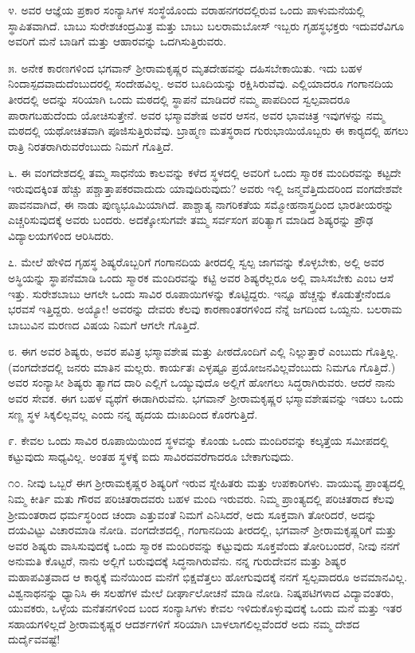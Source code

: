  ೪. ಅವರ ಆಜ್ಞೆಯ ಪ್ರಕಾರ ಸಂನ್ಯಾಸಿಗಳ ಸಂಸ್ಥೆಯೊಂದು ವರಾಹನಗರದಲ್ಲಿರುವ ಒಂದು ಪಾಳುಮನೆಯಲ್ಲಿ ಸ್ಥಾಪಿತವಾಗಿದೆ. ಬಾಬು ಸುರೇಶಚಂದ್ರಮಿತ್ರ ಮತ್ತು ಬಾಬು ಬಲರಾಮಬೋಸ್ ಇಬ್ಬರು ಗೃಹಸ್ಥಭಕ್ತರು ಇದುವರೆವಿಗೂ ಅವರಿಗೆ ಮನೆ ಬಾಡಿಗೆ ಮತ್ತು ಆಹಾರವನ್ನು ಒದಗಿಸುತ್ತಿರುವರು. 

 ೫. ಅನೇಕ ಕಾರಣಗಳಿಂದ ಭಗವಾನ್ ಶ‍್ರೀರಾಮಕೃಷ್ಣರ ಮೃತದೇಹವನ್ನು ದಹಿಸಬೇಕಾಯಿತು. ಇದು ಬಹಳ ನಿಂದಾಸ್ಪದವಾದುದೆಂಬುದರಲ್ಲಿ ಸಂದೇಹವಿಲ್ಲ. ಅವರ ಬೂದಿಯನ್ನು ರಕ್ಷಿಸಿರುವೆವು. ಎಲ್ಲಿಯಾದರೂ ಗಂಗಾನದಿಯ ತೀರದಲ್ಲಿ ಅದನ್ನು ಸರಿಯಾಗಿ ಒಂದು ಮಠದಲ್ಲಿ ಸ್ಥಾಪನೆ ಮಾಡಿದರೆ ನಮ್ಮ ಪಾಪದಿಂದ ಸ್ವಲ್ಪವಾದರೂ ಪಾರಾಗಬಹುದೆಂದು ಯೋಚಿಸುತ್ತೇನೆ. ಅವರ ಭಸ್ಮಾವಶೇಷ ಅವರ ಆಸನ, ಅವರ ಭಾವಚಿತ್ರ ಇವುಗಳನ್ನು ನಮ್ಮ ಮಠದಲ್ಲಿ ಯಥೋಚಿತವಾಗಿ ಪೂಜಿಸುತ್ತಿರುವೆವು. ಬ್ರಾಹ್ಮಣ ಮತಸ್ಥರಾದ ಗುರುಭಾಯಿಯೊಬ್ಬರು ಈ ಕಾರ‍್ಯದಲ್ಲಿ ಹಗಲು ರಾತ್ರಿ ನಿರತರಾಗಿರುವರೆಂಬುದು ನಿಮಗೆ ಗೊತ್ತಿದೆ. 

 ೬. ಈ ವಂಗದೇಶದಲ್ಲಿ ತಮ್ಮ ಸಾಧನೆಯ ಕಾಲವನ್ನು ಕಳೆದ ಸ್ಥಳದಲ್ಲಿ ಅವರಿಗೆ ಒಂದು ಸ್ಮಾರಕ ಮಂದಿರವನ್ನು ಕಟ್ಟದೇ ಇರುವುದಕ್ಕಿಂತ ಹೆಚ್ಚು ಪಶ್ಚಾತ್ತಾಪಕರವಾದುದು ಯಾವುದಿರುವುದು? ಅವರು ಇಲ್ಲಿ ಜನ್ಮವೆತ್ತಿದುದರಿಂದ ವಂಗದೇಶವೇ ಪಾವನವಾಗಿದೆ, ಈ ನಾಡು ಪುಣ್ಯಭೂಮಿಯಾಗಿದೆ. ಪಾಶ್ಚಾತ್ಯ ನಾಗರಿಕತೆಯ ಸಮ್ಮೋಹನಾಸ್ತ್ರದಿಂದ ಭಾರತೀಯರನ್ನು ಎಚ್ಚರಿಸುವುದಕ್ಕೆ ಅವರು ಬಂದರು. ಅದಕ್ಕೋಸುಗವೇ ತಮ್ಮ ಸರ್ವಸಂಗ ಪರಿತ್ಯಾಗ ಮಾಡಿದ ಶಿಷ್ಯರನ್ನು ಪ್ರೌಢ ವಿದ್ಯಾಲಯಗಳಿಂದ ಆರಿಸಿದರು. 

 ೭. ಮೇಲೆ ಹೇಳಿದ ಗೃಹಸ್ಥ ಶಿಷ್ಯರೊಬ್ಬರಿಗೆ ಗಂಗಾನದಿಯ ತೀರದಲ್ಲಿ ಸ್ವಲ್ಪ ಜಾಗವನ್ನು ಕೊಳ್ಳಬೇಕು, ಅಲ್ಲಿ ಅವರ ಅಸ್ಥಿಯನ್ನು ಸ್ಥಾಪನೆಮಾಡಿ ಒಂದು ಸ್ಮಾರಕ ಮಂದಿರವನ್ನು ಕಟ್ಟಿ ಅವರ ಶಿಷ್ಯರೆಲ್ಲರೂ ಅಲ್ಲಿ ವಾಸಿಸಬೇಕು ಎಂಬ ಆಸೆ ಇತ್ತು. ಸುರೇಶಬಾಬು ಆಗಲೇ ಒಂದು ಸಾವಿರ ರೂಪಾಯಿಗಳನ್ನು ಕೊಟ್ಟಿದ್ದರು. ಇನ್ನೂ ಹೆಚ್ಚನ್ನು ಕೊಡುತ್ತೇನೆಂದೂ ಭರವಸೆ ಇತ್ತಿದ್ದರು. ಅಯ್ಯೋ! ಅವರನ್ನು ದೇವರು ಕೆಲವು ಕಾರಣಾಂತರಗಳಿಂದ ನೆನ್ನೆ ಜಗದಿಂದ ಒಯ್ದನು. ಬಲರಾಮ ಬಾಬುವಿನ ಮರಣದ ವಿಷಯ ನಿಮಗೆ ಆಗಲೇ ಗೊತ್ತಿದೆ. 

 ೮. ಈಗ ಅವರ ಶಿಷ್ಯರು, ಅವರ ಪವಿತ್ರ ಭಸ್ಮಾವಶೇಷ ಮತ್ತು ಪೀಠದೊಂದಿಗೆ ಎಲ್ಲಿ ನಿಲ್ಲುತ್ತಾರೆ ಎಂಬುದು ಗೊತ್ತಿಲ್ಲ. (ವಂಗದೇಶದಲ್ಲಿ ಜನರು ಮಾತಿನ ಮಲ್ಲರು. ಕಾರ್ಯತಃ ಎಳ್ಳಷ್ಟೂ ಪ್ರಯೋಜನವಿಲ್ಲವೆಂಬುದು ನಿಮಗೂ ಗೊತ್ತಿದೆ.) ಅವರ ಸಂನ್ಯಾಸೀ ಶಿಷ್ಯರು ತ್ಯಾಗದ ದಾರಿ ಎಲ್ಲಿಗೆ ಒಯ್ಯುವುದೊ ಅಲ್ಲಿಗೆ ಹೋಗಲು ಸಿದ್ಧರಾಗಿರುವರು. ಆದರೆ ನಾನು ಅವರ ಸೇವಕ. ಈಗ ಬಹಳ ವ್ಯಥೆಗೆ ಈಡಾಗಿರುವೆನು. ಭಗವಾನ್ ಶ‍್ರೀರಾಮಕೃಷ್ಣರ ಭಸ್ಮಾವಶೇಷವನ್ನು ಇಡಲು ಒಂದು ಸಣ್ಣ ಸ್ಥಳ ಸಿಕ್ಕಲಿಲ್ಲವಲ್ಲ ಎಂದು ನನ್ನ ಹೃದಯ ದುಃಖದಿಂದ ಕೊರಗುತ್ತಿದೆ. 

 ೯. ಕೇವಲ ಒಂದು ಸಾವಿರ ರೂಪಾಯಿಯಿಂದ ಸ್ಥಳವನ್ನು ಕೊಂಡು ಒಂದು ಮಂದಿರವನ್ನು ಕಲ್ಕತ್ತೆಯ ಸಮೀಪದಲ್ಲಿ ಕಟ್ಟುವುದು ಸಾಧ್ಯವಿಲ್ಲ. ಅಂತಹ ಸ್ಥಳಕ್ಕೆ ಐದು ಸಾವಿರದವರೆಗಾದರೂ ಬೇಕಾಗುವುದು. 

 ೧೦. ನೀವು ಒಬ್ಬರೆ ಈಗ ಶ‍್ರೀರಾಮಕೃಷ್ಣರ ಶಿಷ್ಯರಿಗೆ ಇರುವ ಸ್ನೇಹಿತರು ಮತ್ತು ಉಪಕಾರಿಗಳು. ವಾಯುವ್ಯ ಪ್ರಾಂತ್ಯದಲ್ಲಿ ನಿಮ್ಮ ಕೀರ್ತಿ ಮತು ಗೌರವ ಪರಿಚಿತರಾದವರು ಬಹಳ ಮಂದಿ ಇರುವರು. ನಿಮ್ಮ ಪ್ರಾಂತ್ಯದಲ್ಲಿ ಪರಿಚಿತರಾದ ಕೆಲವು ಶ‍್ರೀಮಂತರಾದ ಧರ್ಮಸ್ಥರಿಂದ ಚಂದಾ ಎತ್ತುವಂತೆ ನಿಮಗೆ ಎನಿಸಿದರೆ, ಅದು ಸೂಕ್ತವಾಗಿ ತೋರಿದರೆ, ಅದನ್ನು ದಯವಿಟ್ಟು ವಿಚಾರಮಾಡಿ ನೋಡಿ. ವಂಗದೇಶದಲ್ಲಿ, ಗಂಗಾನದಿಯ ತೀರದಲ್ಲಿ, ಭಗವಾನ್ ಶ‍್ರೀರಾಮಕೃಷ್ಣರಿಗೆ ಮತ್ತು ಅವರ ಶಿಷ್ಯರು ವಾಸಿಸುವುದಕ್ಕೆ ಒಂದು ಸ್ಮಾರಕ ಮಂದಿರವನ್ನು ಕಟ್ಟುವುದು ಸೂಕ್ತವೆಂದು ತೋರಿಬಂದರೆ, ನೀವು ನನಗೆ ಅನುಮತಿ ಕೊಟ್ಟರೆ, ನಾನು ಅಲ್ಲಿಗೆ ಬರುವುದಕ್ಕೆ ಸಿದ್ಧನಾಗಿರುವೆನು. ನನ್ನ ಗುರುದೇವನ ಮತ್ತು ಶಿಷ್ಯರ ಮಹಾಪವಿತ್ರವಾದ ಆ ಕಾರ‍್ಯಕ್ಕೆ ಮನೆಯಿಂದ ಮನೆಗೆ ಭಿಕ್ಷವೆತ್ತಲು ಹೋಗುವುದಕ್ಕೆ ನನಗೆ ಸ್ವಲ್ಪವಾದರೂ ಅವಮಾನವಿಲ್ಲ. ವಿಶ್ವನಾಥನನ್ನು ಧ್ಯಾನಿಸಿ ಈ ಸಲಹೆಗಳ ಮೇಲೆ ದೀರ್ಘಾಲೋಚನೆ ಮಾಡಿ ನೋಡಿ. ನಿಷ್ಕಪಟಿಗಳಾದ ವಿದ್ಯಾವಂತರು, ಯುವಕರು, ಒಳ್ಳೆಯ ಮನೆತನಗಳಿಂದ ಬಂದ ಸಂನ್ಯಾಸಿಗಳು ಕೇವಲ ಇಳಿದುಕೊಳ್ಳುವುದಕ್ಕೆ ಒಂದು ಮನೆ ಮತ್ತು ಇತರ ಸಹಾಯಗಳಿಲ್ಲದೆ ಶ‍್ರೀರಾಮಕೃಷ್ಣರ ಆದರ್ಶಗಳಿಗೆ ಸರಿಯಾಗಿ ಬಾಳಲಾಗಲಿಲ್ಲವೆಂದರೆ ಅದು ನಮ್ಮ ದೇಶದ ದುರ್ದೈವವಷ್ಟೆ!

